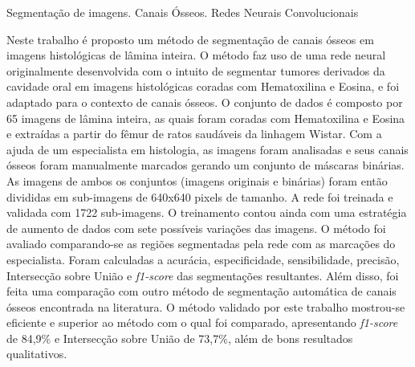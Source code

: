 \documentclass[dissertmst]{ppgco}
\begin{document}


\begin{resumo}{Segmentação de imagens. Canais Ósseos. Redes Neurais Convolucionais}

Neste trabalho é proposto um método de segmentação de canais ósseos em imagens histológicas de lâmina inteira. O método faz uso de uma rede neural originalmente desenvolvida com o intuito de segmentar tumores derivados da cavidade oral em imagens histológicas coradas com Hematoxilina e Eosina, e foi adaptado para o contexto de canais ósseos. O conjunto de dados é composto por 65 imagens de lâmina inteira, as quais foram coradas com Hematoxilina e Eosina e extraídas a partir do fêmur de ratos saudáveis da linhagem Wistar.
Com a ajuda de um especialista em histologia, as imagens foram analisadas e seus canais ósseos foram manualmente marcados gerando um conjunto de máscaras binárias. As imagens de ambos os conjuntos (imagens originais e binárias) foram então divididas em sub-imagens de 640x640 pixels de tamanho. A rede foi treinada e validada com 1722 sub-imagens. O treinamento contou ainda com uma estratégia de aumento de dados com sete possíveis variações das imagens. O método foi avaliado comparando-se as regiões segmentadas pela rede com as marcações do especialista. Foram calculadas a acurácia, especificidade, sensibilidade, precisão, Intersecção sobre União e \textit{f1-score} das segmentações resultantes. Além disso, foi feita uma comparação com outro método de segmentação automática de canais ósseos encontrada na literatura. O método validado por este trabalho mostrou-se eficiente e superior ao método com o qual foi comparado, apresentando \textit{f1-score} de 84,9\% e Intersecção sobre União de 73,7\%, além de bons resultados qualitativos.

\end{resumo}
\end{document}

